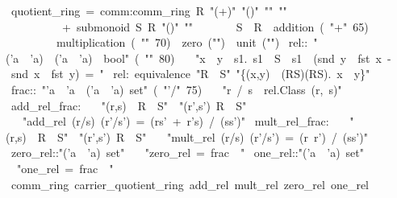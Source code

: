 \documentclass[12pt]{scrartcl}
\begin{document}
\begin{isabelle}
\ quotient\_ring\ =\ comm:comm\_ring\ R\ "(+)"\ "(\isasymcdot )"\ "\isasymzero "\ "\isasymone "\ \isanewline
\ \ \ \ \ \ \ \ \ \ +\ submonoid\ S\ R\ "(\isasymcdot )"\ "\isasymone "\isanewline
\ \ \ \ \ \ \ S\ \ R\ \ addition\ (\ "+"\ 65)\ \isanewline
\ \ \ \ \ \ \ \ \ multiplication\ (\ "\isasymcdot "\ 70)\ \ zero\ ("\isasymzero ")\ \ unit\ ("\isasymone ")\isanewline
{}\isanewline
\isanewline
{}\ rel::\ "('a\ \isasymtimes \ 'a)\ \isasymRightarrow \ ('a\ \isasymtimes \ 'a)\ \isasymRightarrow \ bool"\ (\ "\isasymsim "\ 80)\isanewline
\ \ \ "x\ \isasymsim \ y\ \isasymequiv \ \isasymexists s1.\ s1\ \isasymin \ S\ \isasymand \ s1\ \isasymcdot \ (snd\ y\ \isasymcdot \ fst\ x\ -\ snd\ x\ \isasymcdot \ fst\ y)\ =\ \isasymzero "\isanewline
\isanewline
{}\ rel:\ equivalence\ "R\ \isasymtimes \ S"\ "\{(x,y)\ \isasymin \ (R\isasymtimes S)\isasymtimes (R\isasymtimes S).\ x\ \isasymsim \ y\}"\isanewline
\isanewline
{}\ frac::\ "'a\ \isasymRightarrow \ 'a\ \isasymRightarrow \ ('a\ \isasymtimes \ 'a)\ set"\ (\ "'/"\ 75)\isanewline
\ \ \ "r\ /\ s\ \isasymequiv \ rel.Class\ (r,\ s)"\isanewline
\isanewline
{}\ add\_rel\_frac:\isanewline
\ \ \ "(r,s)\ \isasymin \ R\ \isasymtimes \ S"\ \ "(r',s')\isasymin \ R\ \isasymtimes \ S"\isanewline
\ \ \ "add\_rel\ (r/s)\ (r'/s')\ =\ (r\isasymcdot s'\ +\ r'\isasymcdot s)\ /\ (s\isasymcdot s')"
\isanewline
\isanewline
{}\ mult\_rel\_frac:\isanewline
\ \ \ "(r,s)\ \isasymin \ R\ \isasymtimes \ S"\ \ "(r',s')\isasymin \ R\ \isasymtimes \ S"\isanewline
\ \ \ "mult\_rel\ (r/s)\ (r'/s')\ =\ (r\isasymcdot \ r')\ /\ (s\isasymcdot s')"
\isanewline
\isanewline
{}\ zero\_rel::"('a\ \isasymtimes \ 'a)\ set"\ \isanewline
\ \ "zero\_rel\ =\ frac\ \isasymzero \ \isasymone "\isanewline
\isanewline
{}\ one\_rel::"('a\ \isasymtimes \ 'a)\ set"\ \isanewline
\ \ "one\_rel\ =\ frac\ \isasymone \ \isasymone "\isanewline
\isanewline
{}\ comm\_ring\ carrier\_quotient\_ring\ add\_rel\ mult\_rel\ zero\_rel\ one\_rel\isanewline
\isanewline
{}
\end{isabelle}
\end{document}

